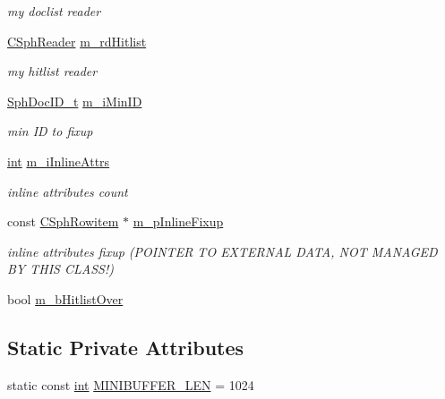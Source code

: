 \begin{DoxyCompactItemize}
\begin{DoxyCompactList}\small\item\em my doclist reader \end{DoxyCompactList}\item 
\hyperlink{classCSphReader}{C\-Sph\-Reader} \hyperlink{classDiskIndexQwordTraits__c_ac8b3bbb101f1ed476d37251f0c460bba}{m\-\_\-rd\-Hitlist}
\begin{DoxyCompactList}\small\item\em my hitlist reader \end{DoxyCompactList}\item 
\hyperlink{sphinx_8h_a3176771631c12a9e4897272003e6b447}{Sph\-Doc\-I\-D\-\_\-t} \hyperlink{classDiskIndexQwordTraits__c_a1d9de45b5d6c9c66cf8847b8b8f3ec58}{m\-\_\-i\-Min\-I\-D}
\begin{DoxyCompactList}\small\item\em min I\-D to fixup \end{DoxyCompactList}\item 
\hyperlink{sphinxexpr_8cpp_a4a26e8f9cb8b736e0c4cbf4d16de985e}{int} \hyperlink{classDiskIndexQwordTraits__c_ab6b9f1f3bc5131ce85e45035084cb667}{m\-\_\-i\-Inline\-Attrs}
\begin{DoxyCompactList}\small\item\em inline attributes count \end{DoxyCompactList}\item 
const \hyperlink{sphinx_8h_a6a2df0f05f3397df8b6e230fda6f852f}{C\-Sph\-Rowitem} $\ast$ \hyperlink{classDiskIndexQwordTraits__c_a3bd884a35f624e03487f5efdcbff1700}{m\-\_\-p\-Inline\-Fixup}
\begin{DoxyCompactList}\small\item\em inline attributes fixup (P\-O\-I\-N\-T\-E\-R T\-O E\-X\-T\-E\-R\-N\-A\-L D\-A\-T\-A, N\-O\-T M\-A\-N\-A\-G\-E\-D B\-Y T\-H\-I\-S C\-L\-A\-S\-S!) \end{DoxyCompactList}\item 
bool \hyperlink{classDiskIndexQwordTraits__c_a5048c96a21e7a3fccc99dfdd7b71c30e}{m\-\_\-b\-Hitlist\-Over}
\end{DoxyCompactItemize}
\subsection*{Static Private Attributes}
\begin{DoxyCompactItemize}
\item 
static const \hyperlink{sphinxexpr_8cpp_a4a26e8f9cb8b736e0c4cbf4d16de985e}{int} \hyperlink{classDiskIndexQwordTraits__c_aa83fb688cb8688383baf8ccaa2de2e06}{M\-I\-N\-I\-B\-U\-F\-F\-E\-R\-\_\-\-L\-E\-N} = 1024
\end{DoxyCompactItemize}
